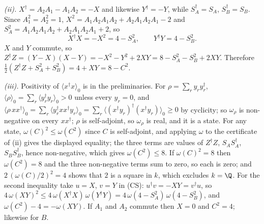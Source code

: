 \emph{(ii).} $X^{\dagger} = A_{2}A_{1} - A_{1}A_{2} = -X$ and likewise $Y^{\dagger} = -Y$, while $S_{A}^{\dagger} = S_{A}$, $S_{B}^{\dagger} = S_{B}$. Since $A_{1}^{2} = A_{2}^{2} = 1$, $X^{2} = A_{1}A_{2}A_{1}A_{2} + A_{2}A_{1}A_{2}A_{1} - 2$ and $S_{A}^{2} = A_{1}A_{2}A_{1}A_{2} + A_{2}A_{1}A_{2}A_{1} + 2$, so
\[
X^{\dagger}X = -X^{2} = 4 - S_{A}^{2}, \qquad Y^{\dagger}Y = 4 - S_{B}^{2}.
\]
$X$ and $Y$ commute, so $Z^{\dagger}Z = (Y - X)(X - Y) = -X^{2} - Y^{2} + 2XY = 8 - S_{A}^{2} - S_{B}^{2} + 2XY$. Therefore $\tfrac12(Z^{\dagger}Z + S_{A}^{2} + S_{B}^{2}) = 4 + XY = 8 - C^{2}$.

\emph{(iii).} Positivity of $\langle x^{\dagger}x\rangle_{0}$ is in the preliminaries. For $\rho = \sum_{r}y_{r}y_{r}^{\dagger}$, $\langle\rho\rangle_{0} = \sum_{r}\langle y_{r}^{\dagger}y_{r}\rangle_{0} > 0$ unless every $y_{r} = 0$, and $\langle\rho\,xx^{\dagger}\rangle_{0} = \sum_{r}\langle y_{r}^{\dagger}xx^{\dagger}y_{r}\rangle_{0} = \sum_{r}\langle(x^{\dagger}y_{r})^{\dagger}(x^{\dagger}y_{r})\rangle_{0} \ge 0$ by cyclicity; so $\omega_{\rho}$ is non-negative on every $xx^{\dagger}$; $\rho$ is self-adjoint, so $\omega_{\rho}$ is real, and it is a state. For any state, $\omega(C)^{2} \le \omega(C^{2})$ since $C$ is self-adjoint, and applying $\omega$ to the certificate of (ii) gives the displayed equality; the three terms are values of $Z^{\dagger}Z$, $S_{A}S_{A}^{\dagger}$, $S_{B}S_{B}^{\dagger}$, hence non-negative, which gives $\omega(C^{2}) \le 8$. If $\omega(C)^{2} = 8$ then $\omega(C^{2}) = 8$ and the three non-negative terms sum to zero, so each is zero; and $2\,(\omega(C)/2)^{2} = 4$ shows that $2$ is a square in $k$, which excludes $k = \Q$. For the second inequality take $u = X$, $v = Y$ in (CS): $u^{\dagger}v = -XY = v^{\dagger}u$, so $4\,\omega(XY)^{2} \le 4\,\omega(X^{\dagger}X)\,\omega(Y^{\dagger}Y) = 4\,\omega(4 - S_{A}^{2})\,\omega(4 - S_{B}^{2})$, and $\omega(C^{2}) - 4 = -\omega(XY)$. If $A_{1}$ and $A_{2}$ commute then $X = 0$ and $C^{2} = 4$; likewise for $B$.

